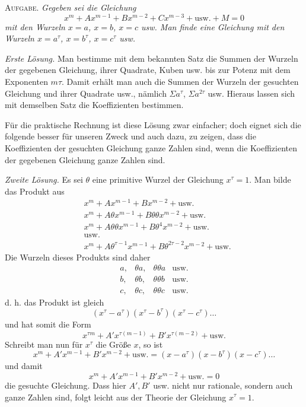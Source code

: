 \clearpage
{}
\textsc{Aufgabe.} \emph{Gegeben sei die Gleichung}
\[
x^m+Ax^{m-1}+Bx^{m-2}+Cx^{m-3}+\text{usw.}+M=0
\]
\emph{mit den Wurzeln $x=a$, $x=b$, $x=c$ usw. Man finde eine Gleichung mit den Wurzeln $x=a^\tau$, $x=b^\tau$, $x=c^\tau$ usw.}

\emph{Erste Lösung.} Man bestimme mit dem bekannten Satz die Summen der Wurzeln der gegebenen Gleichung, ihrer Quadrate, Kuben usw. bis zur Potenz mit dem Exponenten $m\tau$. Damit erhält man auch die Summen der Wurzeln der gesuchten Gleichung und ihrer Quadrate usw., nämlich $\Sigma a^\tau$, $\Sigma a^{2\tau}$ usw. Hieraus lassen sich mit demselben Satz die Koeffizienten bestimmen.

Für die praktische Rechnung ist diese Lösung zwar einfacher; doch eignet sich die folgende besser für unseren Zweck und auch dazu, zu zeigen, dass die Koeffizienten der gesuchten Gleichung ganze Zahlen sind, wenn die Koeffizienten der gegebenen Gleichung ganze Zahlen sind.

\emph{Zweite Lösung.} Es sei $\theta$ eine primitive Wurzel der Gleichung $x^\tau=1$. Man bilde das Produkt aus
\[
\begin{aligned}
&x^m+Ax^{m-1}+Bx^{m-2}+\text{usw.}\\
&x^m+A\theta x^{m-1}+B\theta\theta x^{m-2}+\text{usw.}\\
&x^m+A\theta\theta x^{m-1}+B\theta^4x^{m-2}+\text{usw.}\\
&\text{usw.}\\
&x^m+A\theta^{\tau-1}x^{m-1}+B\theta^{2\tau-2}x^{m-2}+\text{usw.}
\end{aligned}
\]
Die Wurzeln dieses Produkts sind daher
\[
\begin{array}{llll}
a,&\theta a,&\theta\theta a&\text{usw.}\\
b,&\theta b,&\theta\theta b&\text{usw.}\\
c,&\theta c,&\theta\theta c&\text{usw.}
\end{array}
\]
d. h. das Produkt ist gleich
\[
(x^\tau-a^\tau)(x^\tau-b^\tau)(x^\tau-c^\tau)\ldots
\]
und hat somit die Form
\[
x^{\tau m}+A'x^{\tau(m-1)}+B'x^{\tau(m-2)}+\text{usw.}
\]
Schreibt man nun für $x^\tau$ die Größe $x$, so ist
\[
x^m+A'x^{m-1}+B'x^{m-2}+\text{usw.}=(x-a^\tau)(x-b^\tau)(x-c^\tau)\ldots
\]
und damit
\[
x^m+A'x^{m-1}+B'x^{m-2}+\text{usw.}=0
\]
die gesuchte Gleichung. Dass hier $A',B'$ usw. nicht nur rationale, sondern auch ganze Zahlen sind, folgt leicht aus der Theorie der Gleichung $x^\tau=1$.

